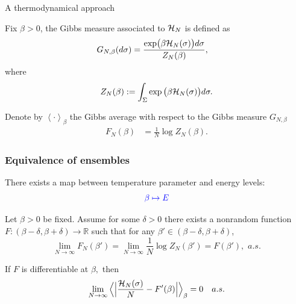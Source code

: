 \documentclass[handout]{beamer}
\def\H{{\cal H}}
\def\la{{\Bigl\langle}}
\def\ra{{\Bigr\rangle}}
\begin{document}
\begin{frame}{A thermodynamical approach}

	Fix $\beta>0$, the Gibbs measure associated to $\H_{N}$ is defined as
    		\begin{align*}
    		G_{N,\beta}(d\sigma)&=\frac{\exp\bigl(\beta \H_N(\sigma)\bigr)d\sigma}{Z_N(\beta)},
    		\end{align*}
where $$Z_N(\beta):=\int_{\Sigma}\exp \big( \beta \H_N(\sigma)\big)d\sigma.$$ 

    		Denote by $\left<\cdot\right>_\beta$ the Gibbs average with respect to the Gibbs measure $G_{N,\beta}$ 
		\begin{align*}
    		F_N(\beta)&=\frac{1}{N}\log Z_{N}(\beta).
    		\end{align*}
\end{frame}



\begin{frame}
	\frametitle{Equivalence of ensembles}
	
There exists a map between temperature parameter and energy levels: 	
	$$\begin{color}{blue} \beta \mapsto E \end{color} $$
	
	
Let $\beta>0$ be fixed. Assume for some $\delta >0$  there exists a nonrandom function $F:(\beta-\delta,\beta+\delta)\rightarrow\mathbb{R}$ such that for any $\beta'\in(\beta-\delta,\beta+\delta)$, 
$$    		\lim_{N\rightarrow\infty}F_N(\beta')= \lim_{N\rightarrow\infty}\frac{1}{N}\log Z_{N}(\beta')=F(\beta'), \,\,a.s.$$

\begin{theorem} If $F$ is differentiable at $\beta,$ then
  $$ \lim_{N\rightarrow\infty}  \la  \Big |\frac{\mathcal H_N(\sigma)}{N}-F'(\beta) \Big |  \ra_\beta=0 \quad a.s.$$
  \end{theorem}
  
 \end{frame}


\end{document}
